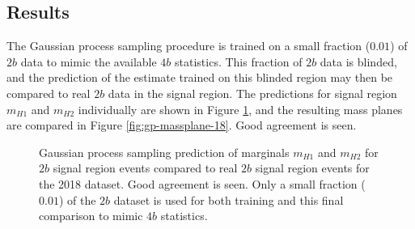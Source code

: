 \subsection{Results}
The Gaussian process sampling procedure is trained on a small fraction ($0.01$) of $2b$ data to mimic 
the available $4b$ statistics. This fraction of $2b$ data is blinded, and the prediction of the estimate trained on 
this blinded region may then be compared to real $2b$ data in the signal region. The 
predictions for signal region $m_{H1}$ and $m_{H2}$ individually are shown in 
Figure \ref{fig:gp-marginals-18}, and the resulting mass planes are compared in Figure \ref{fig:gp-massplane-18}.
Good agreement is seen.
\begin{figure}[ht]
	\centering
	\caption{\label{fig:gp-marginals-18} Gaussian process sampling prediction of marginals $m_{H1}$ and $m_{H2}$ 
	for $2b$ signal region events compared to real $2b$ signal region events for the 2018 dataset. Good agreement 
	is seen. Only a small fraction ($0.01$) of the $2b$ dataset is used for both training and this final 
	comparison to mimic $4b$ statistics.}
\end{figure}

